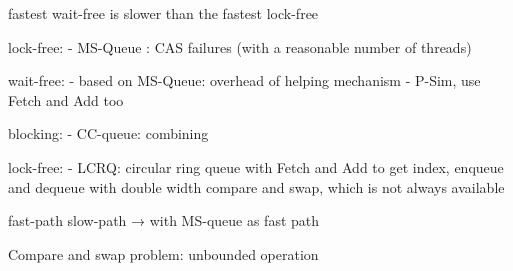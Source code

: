 fastest wait-free is slower than the fastest lock-free

lock-free:
 - MS-Queue : CAS failures (with a reasonable number of threads)

wait-free:
- based on MS-Queue: overhead of helping mechanism
- P-Sim, use Fetch and Add too

blocking:
- CC-queue: combining

lock-free:
- LCRQ: circular ring queue with Fetch and Add to get index, enqueue and dequeue
with double width compare and swap, which is not always available

fast-path slow-path → with MS-queue as fast path

Compare and swap problem: unbounded operation
